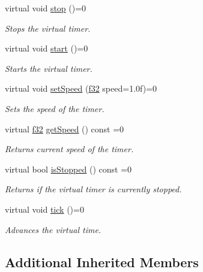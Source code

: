 \begin{DoxyCompactItemize}
virtual void \hyperlink{classirr_1_1ITimer_a649e7294fafc6e6de00f9a4dc6894c16}{stop} ()=0
\begin{DoxyCompactList}\small\item\em Stops the virtual timer. \end{DoxyCompactList}\item 
virtual void \hyperlink{classirr_1_1ITimer_a9467dc5a72de3869712715d0473c9697}{start} ()=0
\begin{DoxyCompactList}\small\item\em Starts the virtual timer. \end{DoxyCompactList}\item 
virtual void \hyperlink{classirr_1_1ITimer_a13f3f4919a3431733bc90cd87d110675}{set\+Speed} (\hyperlink{namespaceirr_a0277be98d67dc26ff93b1a6a1d086b07}{f32} speed=1.\+0f)=0
\begin{DoxyCompactList}\small\item\em Sets the speed of the timer. \end{DoxyCompactList}\item 
virtual \hyperlink{namespaceirr_a0277be98d67dc26ff93b1a6a1d086b07}{f32} \hyperlink{classirr_1_1ITimer_ac2b3c1947d78e5bb9dc62f32edc4e1b2}{get\+Speed} () const =0
\begin{DoxyCompactList}\small\item\em Returns current speed of the timer. \end{DoxyCompactList}\item 
\mbox{\label{classirr_1_1ITimer_ac868245b9562f0c13b2e0ce127c48532}} 
virtual bool \hyperlink{classirr_1_1ITimer_ac868245b9562f0c13b2e0ce127c48532}{is\+Stopped} () const =0
\begin{DoxyCompactList}\small\item\em Returns if the virtual timer is currently stopped. \end{DoxyCompactList}\item 
virtual void \hyperlink{classirr_1_1ITimer_a50ee793711cace4410e1f9c9e1ce20c6}{tick} ()=0
\begin{DoxyCompactList}\small\item\em Advances the virtual time. \end{DoxyCompactList}\end{DoxyCompactItemize}
\subsection*{Additional Inherited Members}


